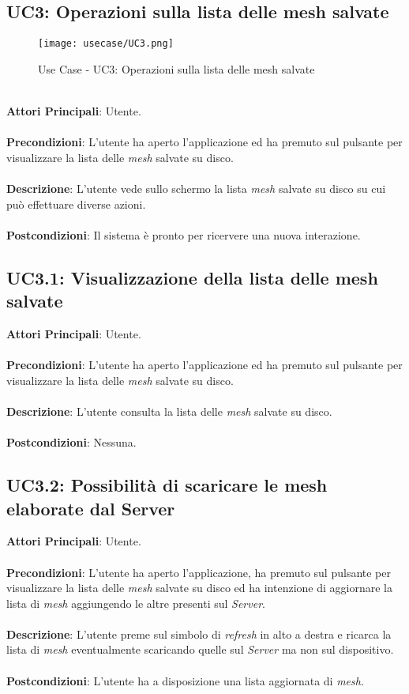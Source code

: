 \subsection{UC3: Operazioni sulla lista delle mesh salvate}
\begin{figure}[!h] 
    \centering 
    \texttt{[image: usecase/UC3.png]} 
    \caption{Use Case - UC3: Operazioni sulla lista delle mesh salvate}
\end{figure}
\ \\
\textbf{Attori Principali}: Utente.
\\\\ \textbf{Precondizioni}: L'utente ha aperto l'applicazione ed ha premuto sul pulsante per visualizzare la lista delle \emph{mesh} salvate su disco.
\\\\ \textbf{Descrizione}: L'utente vede sullo schermo la lista \emph{mesh} salvate su disco su cui può effettuare diverse azioni.
\\\\ \textbf{Postcondizioni}: Il sistema è pronto per ricervere una nuova interazione.




\subsection{UC3.1: Visualizzazione della lista delle mesh salvate}
\textbf{Attori Principali}: Utente.
\\\\ \textbf{Precondizioni}: L'utente ha aperto l'applicazione ed ha premuto sul pulsante per visualizzare la lista delle \emph{mesh} salvate su disco.
\\\\ \textbf{Descrizione}:  L'utente consulta la lista delle \emph{mesh} salvate su disco.
\\\\ \textbf{Postcondizioni}: Nessuna.

\subsection{UC3.2: Possibilità di scaricare le mesh elaborate dal Server}
\textbf{Attori Principali}: Utente.
\\\\ \textbf{Precondizioni}: L'utente ha aperto l'applicazione, ha premuto sul pulsante per visualizzare la lista delle \emph{mesh} salvate su disco ed ha intenzione di aggiornare la lista di \emph{mesh} aggiungendo le altre presenti sul \emph{Server}.
\\\\ \textbf{Descrizione}: L'utente preme sul simbolo di \emph{refresh} in alto a destra e ricarca la lista di \emph{mesh} eventualmente scaricando quelle sul \emph{Server} ma non sul dispositivo.
\\\\ \textbf{Postcondizioni}: L'utente ha a disposizione una lista aggiornata di \emph{mesh}.

